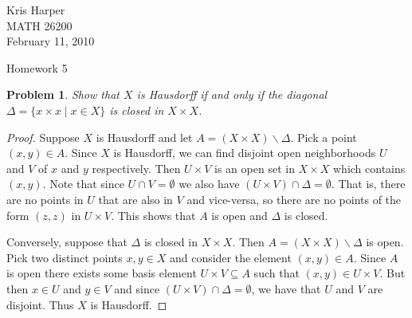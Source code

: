 \documentclass{article}
\newtheorem{problem}{Problem}
\begin{document}
\begin{flushright}
Kris Harper\\

MATH 26200\\

February 11, 2010
\end{flushright}

\begin{center}
Homework 5
\end{center}

\begin{problem}
Show that $X$ is Hausdorff if and only if the \emph{diagonal} $\Delta = \{x \times x \mid x \in X\}$ is closed in $X \times X$.
\end{problem}
\begin{proof}
Suppose $X$ is Hausdorff and let $A = (X \times X) \backslash \Delta$. Pick a point $(x,y) \in A$. Since $X$ is Hausdorff, we can find disjoint open neighborhoods $U$ and $V$ of $x$ and $y$ respectively. Then $U \times V$ is an open set in $X \times X$ which contains $(x,y)$. Note that since $U \cap V = \emptyset$ we also have $(U \times V) \cap \Delta = \emptyset$. That is, there are no points in $U$ that are also in $V$ and vice-versa, so there are no points of the form $(z,z)$ in $U \times V$. This shows that $A$ is open and $\Delta$ is closed.

Conversely, suppose that $\Delta$ is closed in $X \times X$. Then $A = (X \times X) \backslash \Delta$ is open. Pick two distinct points $x,y \in X$ and consider the element $(x,y) \in A$. Since $A$ is open there exists some basis element $U \times V \subseteq A$ such that $(x,y) \in U \times V$. But then $x \in U$ and $y \in V$ and since $(U \times V) \cap \Delta = \emptyset$, we have that $U$ and $V$ are disjoint. Thus $X$ is Hausdorff.
\end{proof}
\end{document}
